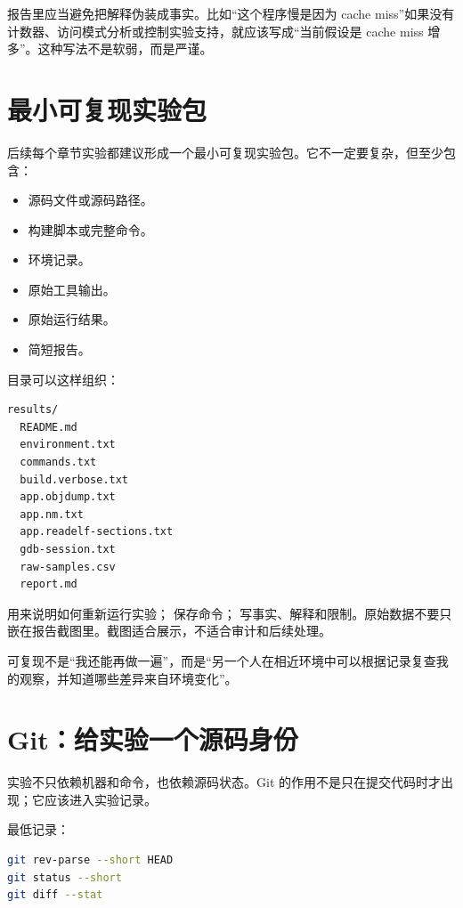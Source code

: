 报告里应当避免把解释伪装成事实。比如“这个程序慢是因为 cache miss”如果没有计数器、访问模式分析或控制实验支持，就应该写成“当前假设是 cache miss 增多”。这种写法不是软弱，而是严谨。

\section{最小可复现实验包}

后续每个章节实验都建议形成一个最小可复现实验包。它不一定要复杂，但至少包含：

\begin{itemize}
  \item 源码文件或源码路径。
  \item 构建脚本或完整命令。
  \item 环境记录。
  \item 原始工具输出。
  \item 原始运行结果。
  \item 简短报告。
\end{itemize}

目录可以这样组织：

\begin{lstlisting}
results/
  README.md
  environment.txt
  commands.txt
  build.verbose.txt
  app.objdump.txt
  app.nm.txt
  app.readelf-sections.txt
  gdb-session.txt
  raw-samples.csv
  report.md
\end{lstlisting}

 用来说明如何重新运行实验； 保存命令； 写事实、解释和限制。原始数据不要只嵌在报告截图里。截图适合展示，不适合审计和后续处理。

\begin{keyidea}
可复现不是“我还能再做一遍”，而是“另一个人在相近环境中可以根据记录复查我的观察，并知道哪些差异来自环境变化”。
\end{keyidea}

\section{Git：给实验一个源码身份}

实验不只依赖机器和命令，也依赖源码状态。Git 的作用不是只在提交代码时才出现；它应该进入实验记录。

最低记录：

\begin{lstlisting}[language=bash]
git rev-parse --short HEAD
git status --short
git diff --stat
\end{lstlisting}

